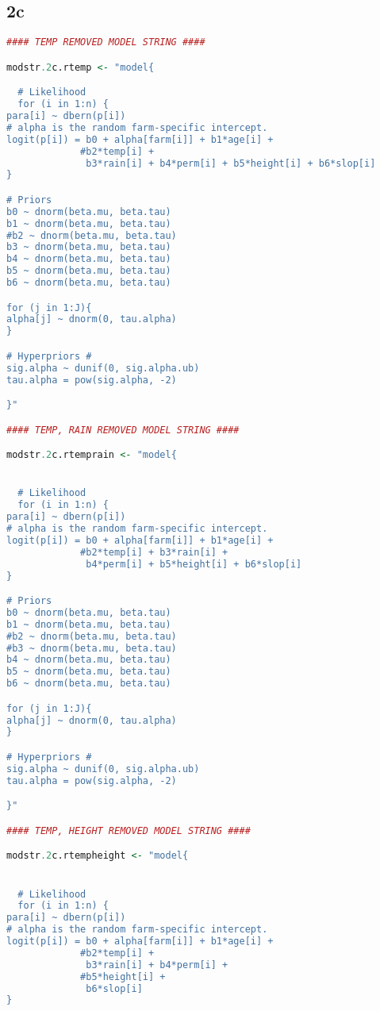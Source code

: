 \documentclass[11pt]{article}
\begin{document}
\subsection{2c} \label{appA2c}
\begin{lstlisting}[language=R]
#### TEMP REMOVED MODEL STRING ####

modstr.2c.rtemp <- "model{

  # Likelihood
  for (i in 1:n) {
para[i] ~ dbern(p[i])
# alpha is the random farm-specific intercept. 
logit(p[i]) = b0 + alpha[farm[i]] + b1*age[i] + 
             #b2*temp[i] + 
              b3*rain[i] + b4*perm[i] + b5*height[i] + b6*slop[i]
}

# Priors
b0 ~ dnorm(beta.mu, beta.tau)
b1 ~ dnorm(beta.mu, beta.tau)
#b2 ~ dnorm(beta.mu, beta.tau)
b3 ~ dnorm(beta.mu, beta.tau)
b4 ~ dnorm(beta.mu, beta.tau)
b5 ~ dnorm(beta.mu, beta.tau)
b6 ~ dnorm(beta.mu, beta.tau)

for (j in 1:J){
alpha[j] ~ dnorm(0, tau.alpha)
}

# Hyperpriors #
sig.alpha ~ dunif(0, sig.alpha.ub)
tau.alpha = pow(sig.alpha, -2)

}"

#### TEMP, RAIN REMOVED MODEL STRING ####

modstr.2c.rtemprain <- "model{


  # Likelihood
  for (i in 1:n) {
para[i] ~ dbern(p[i])
# alpha is the random farm-specific intercept. 
logit(p[i]) = b0 + alpha[farm[i]] + b1*age[i] + 
             #b2*temp[i] + b3*rain[i] + 
              b4*perm[i] + b5*height[i] + b6*slop[i]
}

# Priors
b0 ~ dnorm(beta.mu, beta.tau)
b1 ~ dnorm(beta.mu, beta.tau)
#b2 ~ dnorm(beta.mu, beta.tau)
#b3 ~ dnorm(beta.mu, beta.tau)
b4 ~ dnorm(beta.mu, beta.tau)
b5 ~ dnorm(beta.mu, beta.tau)
b6 ~ dnorm(beta.mu, beta.tau)

for (j in 1:J){
alpha[j] ~ dnorm(0, tau.alpha)
}

# Hyperpriors #
sig.alpha ~ dunif(0, sig.alpha.ub)
tau.alpha = pow(sig.alpha, -2)

}"

#### TEMP, HEIGHT REMOVED MODEL STRING ####

modstr.2c.rtempheight <- "model{


  # Likelihood
  for (i in 1:n) {
para[i] ~ dbern(p[i])
# alpha is the random farm-specific intercept. 
logit(p[i]) = b0 + alpha[farm[i]] + b1*age[i] + 
             #b2*temp[i] + 
              b3*rain[i] + b4*perm[i] + 
             #b5*height[i] + 
              b6*slop[i]
}


\end{lstlisting}
\end{document}
